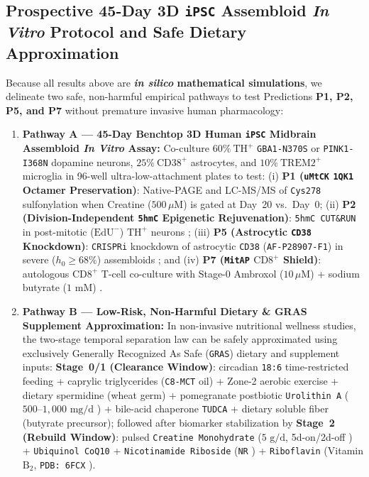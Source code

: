 \documentclass[11pt]{article}
\theoremstyle{plain}
\begin{document}
\subsection{Prospective 45-Day 3D \texttt{iPSC} Assembloid \textit{In Vitro} Protocol and Safe Dietary Approximation}
Because all results above are \textbf{\textit{in silico} mathematical simulations}, we delineate two safe, non-harmful empirical pathways to test Predictions \textbf{P1, P2, P5, and P7} without premature invasive human pharmacology:
\begin{enumerate}
  \item \textbf{Pathway A --- 45-Day Benchtop 3D Human \texttt{iPSC} Midbrain Assembloid \textit{In Vitro} Assay:} Co-culture $60\%\ \mathrm{TH}^+$ \texttt{GBA1-N370S} or \texttt{PINK1-I368N} dopamine neurons, $25\%\ \mathrm{CD38}^+$ astrocytes, and $10\%\ \mathrm{TREM2}^+$ microglia in 96-well ultra-low-attachment plates to test: (i) \textbf{P1 (\texttt{uMtCK} \texttt{1QK1} Octamer Preservation)}: Native-PAGE and LC-MS/MS of \texttt{Cys278} sulfonylation when Creatine ($500\,\mu\mathrm{M}$) is gated at Day~20 vs.\ Day~0; (ii) \textbf{P2 (Division-Independent \texttt{5hmC} Epigenetic Rejuvenation)}: \texttt{5hmC CUT\&RUN} in post-mitotic ($\mathrm{EdU}^-$) $\mathrm{TH}^+$ neurons \cite{berg2026epigenetic}; (iii) \textbf{P5 (Astrocytic \texttt{CD38} Knockdown)}: \texttt{CRISPRi} knockdown of astrocytic \texttt{CD38} (\texttt{AF-P28907-F1}) in severe ($h_0 \ge 68\%$) assembloids \cite{hayakawa2016transfer}; and (iv) \textbf{P7 (\texttt{MitAP} $\mathrm{CD8}^+$ Shield)}: autologous $\mathrm{CD8}^+$ T-cell co-culture with Stage-0 Ambroxol ($10\,\mu\mathrm{M}$) + sodium butyrate ($1\text{ mM}$) \cite{matheoud2019intestinal}.
  \item \textbf{Pathway B --- Low-Risk, Non-Harmful Dietary \& GRAS Supplement Approximation:} In non-invasive nutritional wellness studies, the two-stage temporal separation law can be safely approximated using exclusively Generally Recognized As Safe (\texttt{GRAS}) dietary and supplement inputs: \textbf{Stage~0/1 (Clearance Window)}: circadian \texttt{18:6} time-restricted feeding + caprylic triglycerides (\texttt{C8-MCT} oil) + Zone-2 aerobic exercise + dietary spermidine (wheat germ) + pomegranate postbiotic \texttt{Urolithin A} ($500\text{--}1{,}000\text{ mg/d}$ \cite{ryu2016urolithin,denk2025mitoimmune}) + bile-acid chaperone \texttt{TUDCA} + dietary soluble fiber (butyrate precursor); followed after biomarker stabilization by \textbf{Stage~2 (Rebuild Window)}: pulsed \texttt{Creatine Monohydrate} ($5\text{ g/d}$, 5d-on/2d-off \cite{eder2000umtck}) + \texttt{Ubiquinol CoQ10} + \texttt{Nicotinamide Riboside} (\texttt{NR} \cite{brakedal2022nadpark}) + \texttt{Riboflavin} (Vitamin $\mathrm{B}_2$, \texttt{PDB: 6FCX} \cite{froese2018mthfr}).
\end{enumerate}
\end{document}
